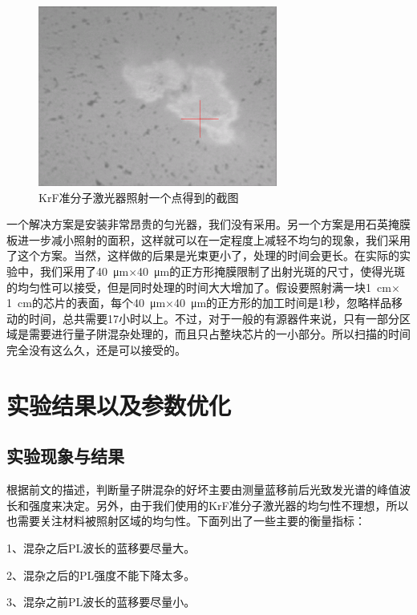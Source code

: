 \documentclass{ZJUthesis}
\begin{document}
\begin{figure}[htbp]
    \centering
    \includegraphics[width=0.7\textwidth]{./Pictures/uv_spot.eps}
    \caption{KrF准分子激光器照射一个点得到的截图}
    \label{fig_uv_spot}
\end{figure}

一个解决方案是安装非常昂贵的匀光器，我们没有采用。另一个方案是用石英掩膜板进一步减小照射的面积，这样就可以在一定程度上减轻不均匀的现象，我们采用了这个方案。当然，这样做的后果是光束更小了，处理的时间会更长。在实际的实验中，我们采用了40~μm$\times$40~μm的正方形掩膜限制了出射光斑的尺寸，使得光斑的均匀性可以接受，但是同时处理的时间大大增加了。假设要照射满一块1~cm$\times$1~cm的芯片的表面，每个40~μm$\times$40~μm的正方形的加工时间是1秒，忽略样品移动的时间，总共需要17小时以上。不过，对于一般的有源器件来说，只有一部分区域是需要进行量子阱混杂处理的，而且只占整块芯片的一小部分。所以扫描的时间完全没有这么久，还是可以接受的。

\section{实验结果以及参数优化}

\subsection{实验现象与结果}

根据前文的描述，判断量子阱混杂的好坏主要由测量蓝移前后光致发光谱的峰值波长和强度来决定。另外，由于我们使用的KrF准分子激光器的均匀性不理想，所以也需要关注材料被照射区域的均匀性。下面列出了一些主要的衡量指标：

1、混杂之后PL波长的蓝移要尽量大。

2、混杂之后的PL强度不能下降太多。

3、混杂之前PL波长的蓝移要尽量小。
\end{document}
